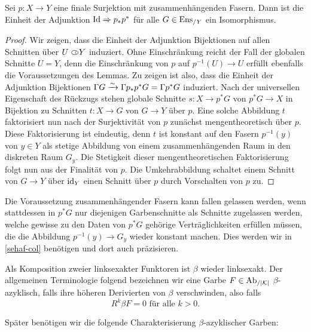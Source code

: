 \begin{lemma}[\cite{TG}, 4.3.22] \label{final-pullback}
  Sei $p: X \to Y$ eine finale Surjektion mit zusammenhängenden
  Fasern. Dann ist die Einheit der Adjunktion $\operatorname{Id} \Rightarrow p_* p^*$ für
  alle $G \in \operatorname{Ens}_{/Y}$ ein Isomorphismus.
\end{lemma}
\begin{proof}
  Wir zeigen, dass die Einheit der Adjunktion Bijektionen auf allen
  Schnitten über $U \subset\kern-0.58em\circ Y$ induziert. Ohne Einschränkung reicht der
  Fall der globalen Schnitte $U = Y$, denn die Einschränkung von $p$
  auf $p^{-1}(U) \to U$ erfüllt ebenfalls die Voraussetzungen des
  Lemmas. Zu zeigen ist also, dass die Einheit der Adjunktion
  Bijektionen $\Gamma G \xrightarrow[]{\sim} \Gamma p_* p^* G = \Gamma p^* G$
  induziert. Nach der universellen Eigenschaft des Rückzugs stehen
  globale Schnitte $s: X \to p^* G$ von $p^* G \to X$ in Bijektion zu
  Schnitten $t: X \to G$ von $G \to Y$ über $p$. Eine solche Abbildung
  $t$ faktorisiert nun nach der Surjektivität von $p$ zunächst
  mengentheoretisch über $p$. Diese Faktorisierung ist eindeutig, denn
  $t$ ist konstant auf den Fasern $p^{-1}(y)$ von $y \in Y$ als
  stetige Abbildung von einem zusammenhängenden Raum in den diskreten
  Raum $G_y$. Die Stetigkeit dieser mengentheoretischen Faktorisierung
  folgt nun aus der Finalität von $p$. Die Umkehrabbildung schaltet
  einem Schnitt von $G \to Y$ über $\operatorname{id}_Y$ einen Schnitt über $p$
  durch Vorschalten von $p$ zu.
\end{proof}
\begin{bem} \label{connected-fibers-subst}
  Die Voraussetzung zusammenhängender Fasern kann fallen gelassen
  werden, wenn stattdessen in $p^* G$ nur diejenigen Garbenschnitte
  als Schnitte zugelassen werden, welche gewisse zu den Daten von $p^*
  G$ gehörige Verträglichkeiten erfüllen müssen, die die Abbildung
  $p^{-1}(y) \to G_y$ wieder konstant machen. Dies werden wir in
  \ref{sehaf-col} benötigen und dort auch präzisieren.
\end{bem}

Als Komposition zweier linksexakter Funktoren ist $\beta$ wieder
linksexakt. Der allgemeinen Terminologie folgend bezeichnen wir eine
Garbe $F \in \operatorname{Ab}_{/|\mathcal{K}|}$ $\beta$-azyklisch, falls ihre höheren Derivierten
von $\beta$ verschwinden, also falls
\[ R^k\beta F = 0 \text{ für alle } k > 0.  \]

Später benötigen wir die folgende Charakterisierung
$\beta$-azyklischer Garben:

